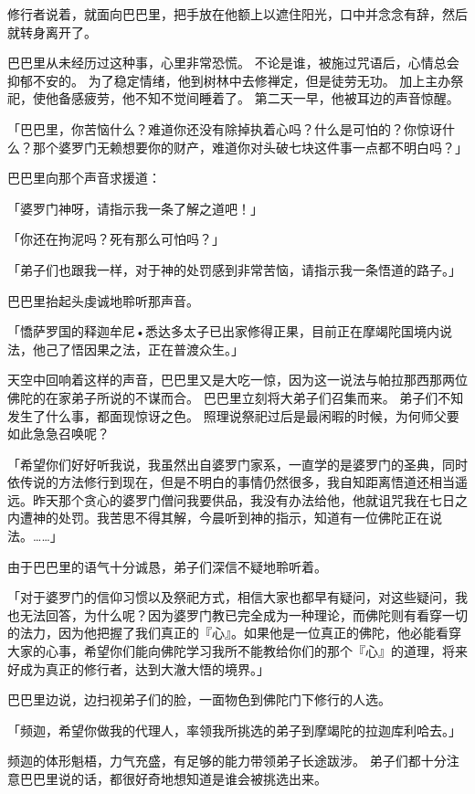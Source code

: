 \documentclass[twoside,openany]{book}
\begin{document}
修行者说着，就面向巴巴里，把手放在他额上以遮住阳光，口中并念念有辞，然后就转身离开了。

巴巴里从未经历过这种事，心里非常恐慌。
不论是谁，被施过咒语后，心情总会抑郁不安的。
为了稳定情绪，他到树林中去修禅定，但是徒劳无功。
加上主办祭祀，使他备感疲劳，他不知不觉间睡着了。
第二天一早，他被耳边的声音惊醒。

「巴巴里，你苦恼什么？难道你还没有除掉执着心吗？什么是可怕的？你惊讶什么？那个婆罗门无赖想要你的财产，难道你对头破七块这件事一点都不明白吗？」

巴巴里向那个声音求援道：

「婆罗门神呀，请指示我一条了解之道吧！」

「你还在拘泥吗？死有那么可怕吗？」

「弟子们也跟我一样，对于神的处罚感到非常苦恼，请指示我一条悟道的路子。」

巴巴里抬起头虔诚地聆听那声音。

「憍萨罗国的释迦牟尼•悉达多太子已出家修得正果，目前正在摩竭陀国境内说法，他己了悟因果之法，正在普渡众生。」

天空中回响着这样的声音，巴巴里又是大吃一惊，因为这一说法与帕拉那西那两位佛陀的在家弟子所说的不谋而合。
巴巴里立刻将大弟子们召集而来。
弟子们不知发生了什么事，都面现惊讶之色。
照理说祭祀过后是最闲暇的时候，为何师父要如此急急召唤呢？

「希望你们好好听我说，我虽然出自婆罗门家系，一直学的是婆罗门的圣典，同时依传说的方法修行到现在，但是不明白的事情仍然很多，我自知距离悟道还相当遥远。昨天那个贪心的婆罗门僧问我要供品，我没有办法给他，他就诅咒我在七日之内遭神的处罚。我苦思不得其解，今晨听到神的指示，知道有一位佛陀正在说法。……」

由于巴巴里的语气十分诚恳，弟子们深信不疑地聆听着。

「对于婆罗门的信仰习惯以及祭祀方式，相信大家也都早有疑问，对这些疑问，我也无法回答，为什么呢？因为婆罗门教已完全成为一种理论，而佛陀则有看穿一切的法力，因为他把握了我们真正的『心』。如果他是一位真正的佛陀，他必能看穿大家的心事，希望你们能向佛陀学习我所不能教给你们的那个『心』的道理，将来好成为真正的修行者，达到大澈大悟的境界。」

巴巴里边说，边扫视弟子们的脸，一面物色到佛陀门下修行的人选。

「频迦，希望你做我的代理人，率领我所挑选的弟子到摩竭陀的拉迦库利哈去。」

频迦的体形魁梧，力气充盛，有足够的能力带领弟子长途跋涉。
弟子们都十分注意巴巴里说的话，都很好奇地想知道是谁会被挑选出来。
\end{document}

